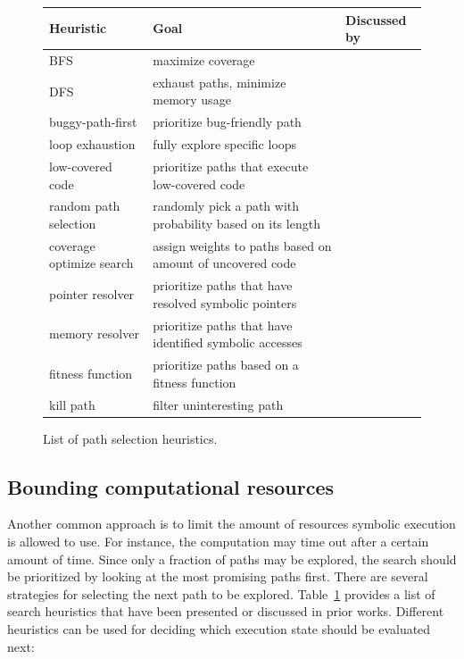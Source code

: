 \begin{figure}[t]
  \centering
  \begin{adjustbox}{width=1\columnwidth}
  \begin{small}
  \begin{tabular}{| l || l || l |}
    \hline      
    Heuristic & Goal & Discussed by \\ \hline\hline
    BFS & maximize coverage & \cite{CKC-TOCS12} \\
    DFS & exhaust paths, minimize memory usage & \cite{EXE-CCS06,CKC-TOCS12} \\
    buggy-path-first & prioritize bug-friendly path  & \cite{AEG-NDSS11} \\
    loop exhaustion & fully explore specific loops  & \cite{AEG-NDSS11} \\
    low-covered code & prioritize paths that execute low-covered code  & \cite{EXE-CCS06} \\
    random path selection & randomly pick a path with probability based on its length & \cite{KLEE-OSDI08} \\
    coverage optimize search & assign weights to paths based on amount of uncovered code & \cite{KLEE-OSDI08,MAYHEM-SP12,CKC-TOCS12} \\
    pointer resolver & prioritize paths that have resolved symbolic pointers & \cite{MAYHEM-SP12} \\
    memory resolver & prioritize paths that have identified symbolic accesses & \cite{MAYHEM-SP12} \\ 
    fitness function & prioritize paths based on a fitness function & \cite{CS-CACM13} \\
    kill path & filter uninteresting path & \cite{CKC-TOCS12} \\
    \hline  
  \end{tabular}
  \end{small}
  \end{adjustbox}
  \caption{List of path selection heuristics.}
  \label{tab:heuristics}
\end{figure}


\subsection{Bounding computational resources}
\label{heuristics}

Another common approach is to limit the amount of resources symbolic execution is allowed to use. For instance, the computation may time out after a certain amount of time. Since only a fraction of paths may be explored, the search should be prioritized by looking at the most promising paths first. There are several strategies for selecting the next path to be explored.
Table~\ref{tab:heuristics} provides a list of search heuristics that have been presented or discussed in prior works. Different heuristics can be used for deciding which execution state should be evaluated next:

